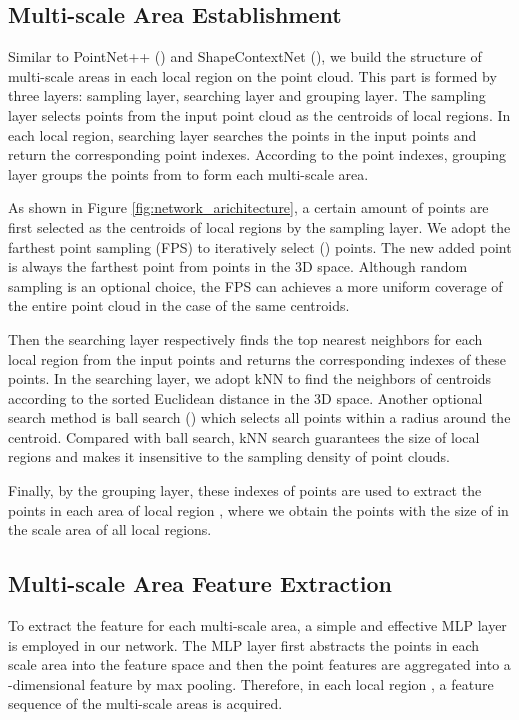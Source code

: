 \documentclass[letterpaper]{article}
\begin{document}
\subsection{Multi-scale Area Establishment}
Similar to PointNet++ (\citealt{qi2017pointnet++}) and ShapeContextNet (\citealt{xie2018attentional}), we build the structure of multi-scale areas in each local region on the point cloud. This part is formed by three layers: sampling layer, searching layer and grouping layer.
The sampling layer selects  points from the input point cloud as the centroids of local regions. 
In each local region, searching layer searches the  points in the input points and return the corresponding point indexes. 
According to the point indexes, grouping layer groups the  points from  to form each multi-scale area.


As shown in Figure \ref{fig:network_arichitecture},  a certain amount of points are first selected as the centroids of local regions by the sampling layer.
We adopt the farthest point sampling (FPS) to iteratively select  () points. 
The new added point  is always the farthest point from points  in the 3D space.
Although random sampling is an optional choice, the FPS can achieves a more uniform coverage of the entire point cloud in the case of the same centroids.

Then the searching layer respectively finds the top  nearest neighbors for each local region  from the input points and returns the corresponding indexes of these points.
In the searching layer, we adopt kNN to find the neighbors of centroids according to the sorted Euclidean distance in the 3D space. 
Another optional search method is ball search (\citealt{qi2017pointnet++}) which selects  all points within a radius around the centroid.
Compared with ball search, kNN search guarantees the size of local regions and makes it insensitive to the sampling density of point clouds.

Finally, by the grouping layer, these indexes of points are used to extract the points in each area of local region , where we obtain the points with the size of  in the scale area  of all local regions.

\subsection{Multi-scale Area Feature Extraction}
To extract the feature for each multi-scale area, a simple and effective MLP layer is employed in our network.
The MLP layer first abstracts the points in each scale area  into the feature space and then the point features are aggregated into a -dimensional feature  by max pooling.
Therefore, in each local region , a  feature sequence  of the multi-scale areas is acquired.
\end{document}
